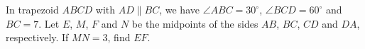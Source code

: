 In trapezoid $ABCD$ with $AD\parallel BC$, we have $\angle ABC=30^\circ$, $\angle BCD=60^\circ$ and $BC=7$. Let $E$, $M$, $F$ and $N$ be the midpoints of the sides $AB$, $BC$, $CD$ and $DA$, respectively. If $MN=3$, find $EF$.
